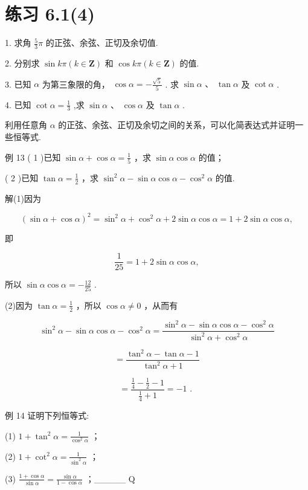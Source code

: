 \documentclass[10pt]{article}
\begin{document}
\section*{练习 6.1(4)}

1. 求角 \(\frac{5}{3}\pi\) 的正弦、余弦、正切及余切值.

2. 分别求 \(\sin {k\pi }\left( {k \in  \mathbf{Z}}\right)\) 和 \(\cos {k\pi }\left( {k \in  \mathbf{Z}}\right)\) 的值.

3. 已知 \(\alpha\) 为第三象限的角， \(\cos \alpha  =  - \frac{\sqrt{5}}{5}\) . 求 \(\sin \alpha \text{ 、 }\tan \alpha\) 及 \(\cot \alpha\) .

4. 已知 \(\cot \alpha  = \frac{1}{3}\) ,求 \(\sin \alpha \text{ 、 }\cos \alpha\) 及 \(\tan \alpha\) .

利用任意角 \(\alpha\) 的正弦、余弦、正切及余切之间的关系，可以化简表达式并证明一些恒等式.

例 13 ( 1 )已知 \(\sin \alpha  + \cos \alpha  = \frac{1}{5}\) ，求 \(\sin \alpha \cos \alpha\) 的值；

( 2 )已知 \(\tan \alpha  = \frac{1}{2}\) ，求 \({\sin }^{2}\alpha  - \sin \alpha \cos \alpha  - {\cos }^{2}\alpha\) 的值.

解(1)因为

\[
{\left( \sin \alpha  + \cos \alpha \right) }^{2} = {\sin }^{2}\alpha  + {\cos }^{2}\alpha  + 2\sin \alpha \cos \alpha  = 1 + 2\sin \alpha \cos \alpha ,
\]

即

\[
\frac{1}{25} = 1 + 2\sin \alpha \cos \alpha ,
\]

所以 \(\sin \alpha \cos \alpha  =  - \frac{12}{25}\) .

(2)因为 \(\tan \alpha  = \frac{1}{2}\) ，所以 \(\cos \alpha  \neq  0\) ，从而有

\[
{\sin }^{2}\alpha  - \sin \alpha \cos \alpha  - {\cos }^{2}\alpha  = \frac{{\sin }^{2}\alpha  - \sin \alpha \cos \alpha  - {\cos }^{2}\alpha }{{\sin }^{2}\alpha  + {\cos }^{2}\alpha }
\]

\[
= \frac{{\tan }^{2}\alpha  - \tan \alpha  - 1}{{\tan }^{2}\alpha  + 1}
\]

\[
= \frac{\frac{1}{4} - \frac{1}{2} - 1}{\frac{1}{4} + 1} =  - 1\text{ . }
\]

例 14 证明下列恒等式:

(1) \(1 + {\tan }^{2}\alpha  = \frac{1}{{\cos }^{2}\alpha }\) ；

(2) \(1 + {\cot }^{2}\alpha  = \frac{1}{{\sin }^{2}\alpha }\) ；

(3) \(\frac{1 + \cos \alpha }{\sin \alpha } = \frac{\sin \alpha }{1 - \cos \alpha }\) ；\_\_\_\_\_ Q
\end{document}
